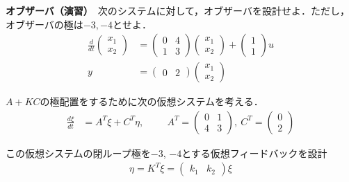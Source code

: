 \newpage
\noindent
{\bf オブザーバ（演習）}　次のシステムに対して，オブザーバを設計せよ．ただし，オブザーバの極は$-3,-4$とせよ．
\begin{align*}
	\frac{d}{dt}
	\left (
	\begin{array}{c}
	 x_1 \\ x_2 
	\end{array}
	\right )
	& = 
	\left (
	\begin{array}{cc}
	 0 & 4 \\
	 1 & 3
	\end{array}
	\right )
	\left (
	\begin{array}{c}
	 x_1 \\ x_2 
	\end{array}
	\right )
	+
	\left (
	\begin{array}{c}
	 1 \\ 1 
	\end{array}
	\right )
	u
\\
	y&=
	\left ( \begin{array}{cc}
		0 & 2 
	\end{array} \right )
	\left (	\begin{array}{c}
		x_1 \\ x_2 
	\end{array} \right )
\end{align*}

$A+KC$の極配置をするために次の仮想システムを考える．
\begin{align*}
 \frac{d \xi}{dt} & = A^T \xi + C^T \eta, 
\hspace{1cm}
	A^T =
	\left (
	\begin{array}{cc}
	 0 & 1 \\
	 4 & 3
	\end{array}
	\right )
	, \ 
	C^T = 
	\left (
	\begin{array}{c}
	 0 \\ 2 
	\end{array}
	\right )
\end{align*}

この仮想システムの閉ループ極を$-3$, $-4$とする仮想フィードバックを設計
\begin{align*}
 \eta =  K^T \xi
	=
	\left ( \begin{array}{cc}
		k_1 & k_2 
	\end{array} \right )
	\xi
\end{align*}

